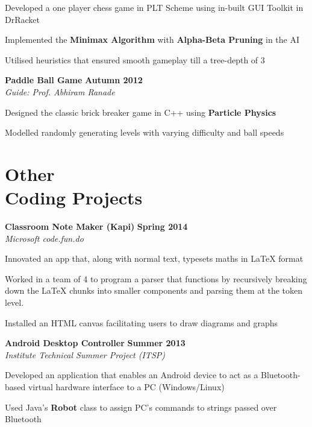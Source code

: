 \documentclass[margin,11pt]{resume}
\begin{document}
\begin{resume}
\begin{list2}
\item Developed a one player chess game in PLT Scheme using in-built GUI Toolkit in DrRacket 
\item Implemented the \textbf{Minimax Algorithm} with \textbf{Alpha-Beta Pruning} in the AI
\item Utilised heuristics that ensured smooth gameplay till a tree-depth of 3
\end{list2}
\vspace{-2.5mm}
\textbf{Paddle Ball Game} \hfill \textbf{Autumn 2012}\\
\textsl{Guide: Prof. Abhiram Ranade}
\begin{list2}
\item Designed the classic brick breaker game in C++ using \textbf{Particle Physics} 
\item Modelled randomly generating levels with varying difficulty and ball speeds 
\end{list2}

\pagebreak

\section{\mysidestyle Other\\ Coding Projects}
\textbf{Classroom Note Maker (Kapi)} \hfill \textbf{Spring 2014}\\
\textsl{Microsoft code.fun.do}
\begin{list2}
\item Innovated an app that, along with normal text, typesets maths in \LaTeX{} format
\item Worked in a team of 4 to program a parser that functions by recursively breaking down the \LaTeX{} chunks into smaller components and parsing them at the token level.
\item Installed an HTML canvas facilitating users to draw diagrams and graphs
\end{list2}
\vspace{-2.5mm}
\textbf{Android Desktop Controller} \hfill \textbf{Summer 2013}\\
\textsl{Institute Technical Summer Project (ITSP)}
\begin{list2}
\item Developed an application that enables an Android device to act as a Bluetooth-based virtual hardware interface to a PC (Windows/Linux)
\item Used Java's \textbf{Robot} class to assign PC's commands to strings passed over Bluetooth
\end{list2}


\end{resume}
\end{document}
